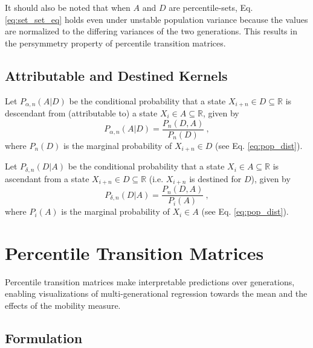 \documentclass{svproc} %
\begin{document}
It should also be noted that when $A$ and $D$ are percentile-sets, Eq. \ref{eq:set_set_eq} holds even under unstable population variance because the values are normalized to the differing variances of the two generations. This results in the persymmetry property of percentile transition matrices. 


\subsection{Attributable and Destined Kernels}

\begin{definition}
Let $P_{\alpha , n}(A | D)$ be the conditional probability that a state $X_{i+n} \in D \subseteq \mathbb{R}$ is descendant from (attributable to) a state $X_i \in A \subseteq \mathbb{R}$, given by
\begin{equation}
P_{\alpha , n}(A | D) = \frac{P_n(D, A)}{P_n(D)} \ , 
\label{eq:attributable}
\end{equation}
where $P_n(D)$ is the marginal probability of $X_{i+n} \in D$ (see Eq. \ref{eq:pop_dist}). 
\label{def:destined}
\end{definition}



\begin{definition}
Let $P_{\delta , n}(D | A)$  be the conditional probability that a state $X_i \in A \subseteq \mathbb{R}$ is ascendant from a state $X_{i+n} \in D \subseteq \mathbb{R}$ (i.e. $X_{i+n}$ is destined for $D$), given by
\begin{equation}
P_{\delta , n}(D | A) = \frac{P_n(D, A)}{P_i(A)} \ , 
\label{eq:destined}
\end{equation}
where $P_i(A)$ is the marginal probability of $X_i \in A$ (see Eq. \ref{eq:pop_dist}). 
\label{def:attributable}
\end{definition}


\section{Percentile Transition Matrices}

Percentile transition matrices make interpretable predictions over generations, enabling visualizations of multi-generational regression towards the mean and the effects of the mobility measure. 

\subsection{Formulation}
\end{document}

